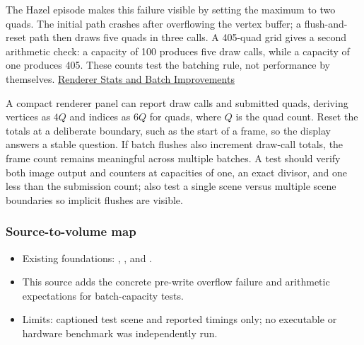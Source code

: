 The Hazel episode makes this failure visible by setting the maximum to two quads. The initial path crashes after overflowing the vertex buffer; a flush-and-reset path then draws five quads in three calls. A 405-quad grid gives a second arithmetic check: a capacity of 100 produces five draw calls, while a capacity of one produces 405. These counts test the batching rule, not performance by themselves. \href{https://www.youtube.com/watch?v=KKv_pZvn2rM}{Renderer Stats and Batch Improvements}

A compact renderer panel can report draw calls and submitted quads, deriving vertices as \(4Q\) and indices as \(6Q\) for quads, where \(Q\) is the quad count. Reset the totals at a deliberate boundary, such as the start of a frame, so the display answers a stable question. If batch flushes also increment draw-call totals, the frame count remains meaningful across multiple batches. A test should verify both image output and counters at capacities of one, an exact divisor, and one less than the submission count; also test a single scene versus multiple scene boundaries so implicit flushes are visible.

\subsubsection{Source-to-volume map}\label{06-engine-ii-ch026-source-to-volume-map-3}

\hypertarget{06-engine-ii-ch026-source-to-volume-map-3}{}

\begin{itemize}
\tightlist
\item
  Existing foundations: , , and .
\item
  This source adds the concrete pre-write overflow failure and arithmetic expectations for batch-capacity tests.
\item
  Limits: captioned test scene and reported timings only; no executable or hardware benchmark was independently run.
\end{itemize}

